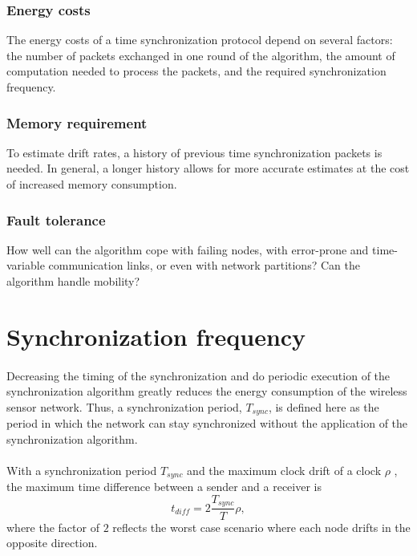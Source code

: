 \documentclass[a4paper,10pt]{report}
\begin{document}
\subsubsection{\textbf{Energy costs}}
The energy costs of a time synchronization protocol depend on
several factors: the number of packets exchanged in one round of the
algorithm, the amount of computation needed to process the packets,
and the required synchronization frequency.
\subsubsection{\textbf{Memory requirement}}
To estimate drift rates, a history of previous time synchronization
packets is needed. In general, a longer history allows for more
accurate estimates at the cost of increased memory consumption.
\subsubsection{\textbf{Fault tolerance}}
How well can the algorithm cope with failing nodes, with error-prone
and time-variable communication links, or even with network
partitions? Can the algorithm handle mobility?
\section{\textbf{Synchronization frequency}}\paragraph*{}
Decreasing the timing of the synchronization and do periodic
execution of the synchronization algorithm greatly reduces the
energy consumption of the wireless sensor network. Thus, a
synchronization period, $T_{sync}$, is defined here as the period in
which the network can stay synchronized without the application of
the synchronization algorithm.
\paragraph*{}
With a synchronization period
$T_{sync}$ and
the maximum clock drift of a clock $\rho$ , the maximum time
difference between a sender and a receiver is
\begin{equation}
t_{diff} = 2\dfrac{T_{sync}}{T}\rho ,
\end{equation}
where the factor of $2$ reflects the worst case scenario where each node drifts in the opposite direction.
\end{document}
